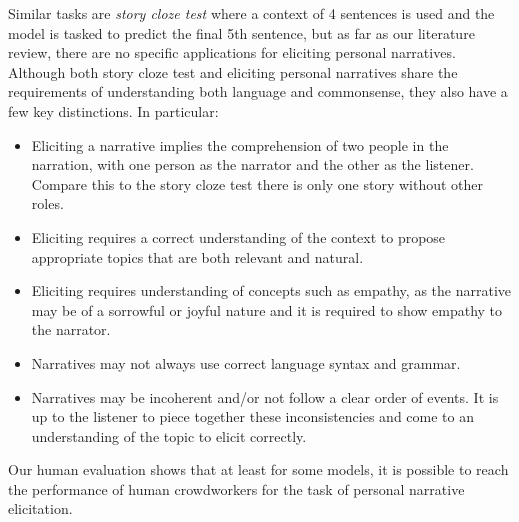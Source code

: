 Similar tasks are \emph{story cloze test} \cite{mostafazadeh2016corpus} where a context of 4 sentences is used and the model is tasked to predict the final 5th sentence, but as far as our literature review, there are no specific applications for eliciting personal narratives. Although both story cloze test and eliciting personal narratives share the requirements of understanding both language and commonsense, they also have a few key distinctions. In particular:
\begin{itemize}
    \item  Eliciting a narrative implies the comprehension of two people in the narration, with one person as the narrator and the other as the listener. Compare this to the story cloze test there is only one story without other roles.
    \item  Eliciting requires a correct understanding of the context to propose appropriate topics that are both relevant and natural.
    \item Eliciting requires understanding of concepts such as empathy, as the narrative may be of a sorrowful or joyful nature and it is required to show empathy to the narrator.
    \item Narratives may not always use correct language syntax and grammar.
    \item Narratives may be incoherent and/or not follow a clear order of events. It is up to the listener to piece together these inconsistencies and come to an understanding of the topic to elicit correctly.
\end{itemize}

Our human evaluation shows that at least for some models, it is possible to reach the performance of human crowdworkers for the task of personal narrative elicitation.


